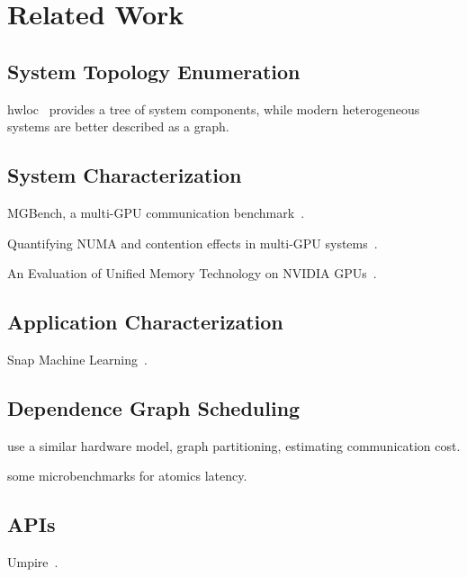 \chapter{Related Work}
\label{ch:related}

\section{System Topology Enumeration}

hwloc~\cite{broquedis2010hwloc} provides a tree of system components, while modern heterogeneous systems are better described as a graph.


\section{System Characterization}

MGBench, a multi-GPU communication benchmark~\cite{bennun2016mgbench}.

Quantifying NUMA and contention effects in multi-GPU systems~\cite{spafford2011quantifying}.

An Evaluation of Unified Memory Technology on NVIDIA GPUs~\cite{li2015evaluation}.

\section{Application Characterization}

Snap Machine Learning~\cite{dunner2018snap}.


\section{Dependence Graph Scheduling}

\cite{amaral2017topology} use a similar hardware model, graph partitioning, estimating communication cost.

\cite{gomez2013performance} some microbenchmarks for atomics latency.

\section{APIs}

Umpire~\cite{beckingsale2018umpire}.

